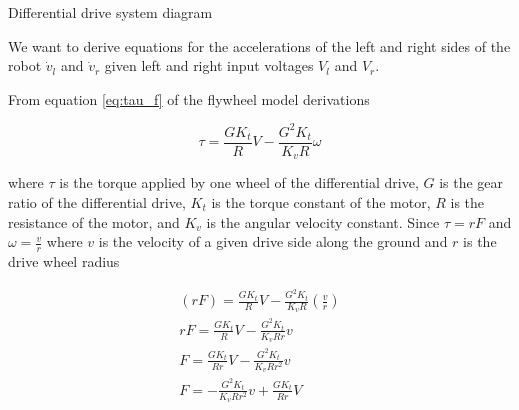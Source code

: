 \begin{bookfigure}

  \caption{Differential drive system diagram}
  \label{fig:diff_drive}
\end{bookfigure}

We want to derive equations for the accelerations of the left and right sides of
the robot $\dot{v}_l$ and $\dot{v}_r$ given left and right input voltages $V_l$
and $V_r$.

From equation \eqref{eq:tau_f} of the flywheel \gls{model} derivations

\begin{equation}
  \tau = \frac{GK_t}{R} V - \frac{G^2K_t}{K_v R} \omega
    \label{eq:diff_drive_tau}
\end{equation}

where $\tau$ is the torque applied by one wheel of the differential drive, $G$
is the gear ratio of the differential drive, $K_t$ is the torque constant of the
motor, $R$ is the resistance of the motor, and $K_v$ is the angular velocity
constant. Since $\tau = rF$ and $\omega = \frac{v}{r}$ where $v$ is the velocity
of a given drive side along the ground and $r$ is the drive wheel radius

\begin{align*}
  (rF) = \frac{GK_t}{R} V - \frac{G^2K_t}{K_v R} \left(\frac{v}{r}\right) \\
  rF = \frac{GK_t}{R} V - \frac{G^2K_t}{K_v Rr} v \\
  F = \frac{GK_t}{Rr} V - \frac{G^2K_t}{K_v Rr^2} v \\
  F = -\frac{G^2K_t}{K_v Rr^2} v + \frac{GK_t}{Rr} V
\end{align*}

